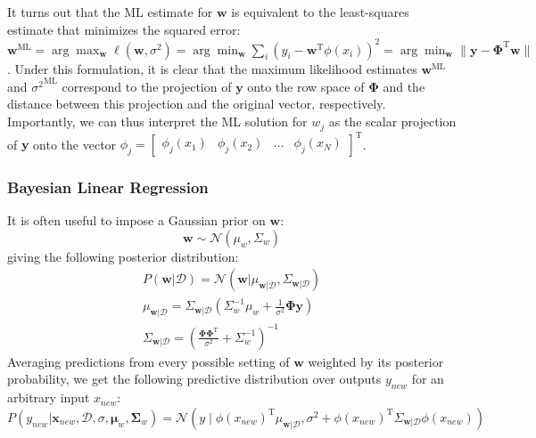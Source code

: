 \documentclass[a4paper]{article}
\begin{document}
It turns out that the ML estimate for $\mathbf{w}$ is equivalent to the least-squares estimate that minimizes the squared error: $\mathbf{w}^\textrm{ML} = \arg\max_\mathbf{w} \ell(\mathbf{w},\sigma^2) = \arg\min_\mathbf{w} \sum_i (y_i - \mathbf{w}^\textrm{T}\phi(x_i))^2 = \arg\min_\mathbf{w} \|\mathbf{y} - \mathbf{\Phi}^\textrm{T}\mathbf{w}\|$. Under this formulation, it is clear that the maximum likelihood estimates $\mathbf{w}^\textrm{ML}$ and ${\sigma^2}^\textrm{ML}$ correspond to the projection of $\mathbf{y}$ onto the row space of $\mathbf{\Phi}$ and the distance between this projection and the original vector, respectively. Importantly, we can thus interpret the ML solution for $w_j$ as the scalar projection of $\mathbf{y}$ onto the vector $\phi_j = \begin{bmatrix}\phi_j(x_1) & \phi_j(x_2) & \ldots & \phi_j(x_N)\end{bmatrix}^\textrm{T}$.

\subsubsection{Bayesian Linear Regression}
It is often useful to impose a Gaussian prior on $\mathbf{w}$:
\[ \mathbf{w} \sim \mathcal{N}(\mu_w,\Sigma_w) \]
giving the following posterior distribution:
\begin{gather*}
P(\mathbf{w}|\mathcal{D}) = \mathcal{N}\left(\mathbf{w}|\mu_{\mathbf{w}|\mathcal{D}},\Sigma_{\mathbf{w}|\mathcal{D}}\right) \\
\mu_{\mathbf{w}|\mathcal{D}} = \Sigma_{\mathbf{w}|\mathcal{D}}\left(\Sigma_w^{-1}\mu_w + \frac{1}{\sigma^2}\mathbf{\Phi y} \right) \\
\Sigma_{\mathbf{w}|\mathcal{D}} = \left(\frac{\mathbf{\Phi\Phi}^\textrm{T}}{\sigma^2}+\Sigma_w^{-1}\right)^{-1}
\end{gather*}
Averaging predictions from every possible setting of $\mathbf{w}$ weighted by its posterior probability, we get the following predictive distribution over outputs $y_{new}$ for an arbitrary input $x_{new}$:
\[ P(y_{new}|\mathbf{x}_{new},\mathcal{D},\sigma,\mathbf{\mu}_w,\mathbf{\Sigma}_w) = \mathcal{N}\left(y\mid \phi(x_{new})^\textrm{T}\mu_{\mathbf{w}|\mathcal{D}},\sigma^2+\phi(x_{new})^\textrm{T}\Sigma_{\mathbf{w}|\mathcal{D}}\phi(x_{new})\right) \]
\end{document}
